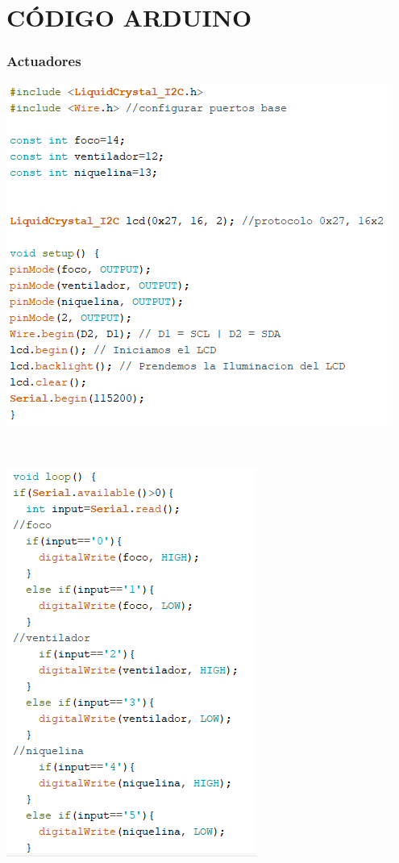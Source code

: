 \documentclass[letterpaper, 10 pt, conference]{ieeeconf}
\begin{document}
\section{CÓDIGO ARDUINO}
\subsubsection{Actuadores}
\begin{center}
\includegraphics[scale=0.65]{Documento/Figuras/10.PNG}
\begin{scriptsize}
\\ 
\end{scriptsize}
\end{center}
\begin{center}
\includegraphics[scale=0.8]{Documento/Figuras/11.PNG}
\begin{scriptsize}
\\ 
\end{scriptsize}
\end{center}
\end{document}
